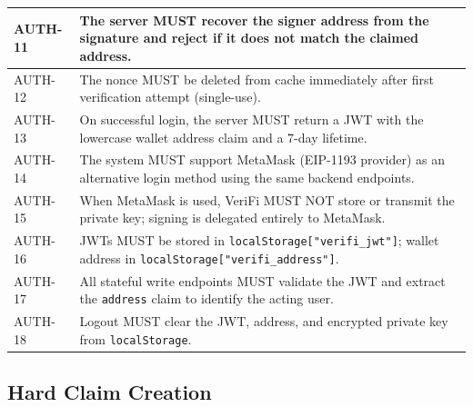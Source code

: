 \documentclass[a4paper,12pt]{report}
\begin{document}
\begin{table}[thbp]
\begin{center}
\begin{tabular}{|l|p{11cm}|}
AUTH-11 & The server MUST recover the signer address from the signature and reject if it does not match the claimed address. \\\hline
AUTH-12 & The nonce MUST be deleted from cache immediately after first verification attempt (single-use). \\\hline
AUTH-13 & On successful login, the server MUST return a JWT with the lowercase wallet address claim and a 7-day lifetime. \\\hline
AUTH-14 & The system MUST support MetaMask (EIP-1193 provider) as an alternative login method using the same backend endpoints. \\\hline
AUTH-15 & When MetaMask is used, VeriFi MUST NOT store or transmit the private key; signing is delegated entirely to MetaMask. \\\hline
AUTH-16 & JWTs MUST be stored in \texttt{localStorage["verifi\_jwt"]}; wallet address in \texttt{localStorage["verifi\_address"]}. \\\hline
AUTH-17 & All stateful write endpoints MUST validate the JWT and extract the \texttt{address} claim to identify the acting user. \\\hline
AUTH-18 & Logout MUST clear the JWT, address, and encrypted private key from \texttt{localStorage}. \\\hline
\end{tabular}
\label{table:auth_req}
\end{center}
\end{table}

\subsection{Hard Claim Creation}
\end{document}
